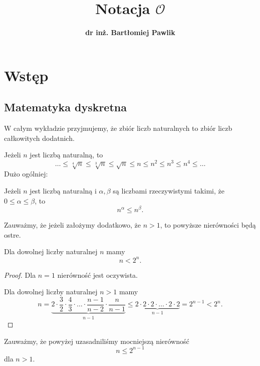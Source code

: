 \documentclass[a4paper,10pt]{beamer}
\title{\bf Notacja $\mathcal{O}$}
\author[B. Pawlik]{\bf dr inż. Bartłomiej Pawlik}
\begin{document}
\begin{frame}
\titlepage
\end{frame}


\section{Wstęp}

\subsection{Matematyka dyskretna}


\begin{frame}
W całym wykładzie przyjmujemy, że zbiór liczb naturalnych to zbiór liczb całkowitych dodatnich.

\bigskip

Jeżeli $n$ jest liczbą naturalną, to
$$\ldots\leqslant \sqrt[4]n\leqslant \sqrt[3]n\leqslant \sqrt{n}\leqslant n\leqslant n^2\leqslant n^3\leqslant n^4\leqslant \ldots$$
Dużo ogólniej:
\begin{block}{}
Jeżeli $n$ jest liczbą naturalną i $\alpha,\beta$ są liczbami rzeczywistymi takimi, że $0\leqslant\alpha\leqslant\beta$, to
$$n^\alpha\leqslant n^\beta.$$
\end{block}
\medskip
Zauważmy, że jeżeli założymy dodatkowo, że $n>1$, to powyższe nierówności będą ostre.

\end{frame}




\begin{frame}

\begin{block}{}
Dla dowolnej liczby naturalnej $n$ mamy $$n<2^n.$$
\end{block}{}

\begin{proof}
Dla $n=1$ nierówność jest oczywista.

Dla dowolnej liczby naturalnej $n>1$ mamy
$$n=\underbrace{2\cdot\frac32\cdot\frac43\cdot\ldots\cdot\frac{n-1}{n-2}\cdot\frac{n}{n-1}}_{n-1}\leqslant\underbrace{2\cdot2\cdot2\cdot\ldots\cdot2\cdot2}_{n-1}=2^{n-1}<2^n.$$
\end{proof}
Zauważmy, że powyżej uzasadniliśmy mocniejszą nierówność
$$n\leqslant2^{n-1}$$
dla $n>1$.
\end{frame}
\end{document}
